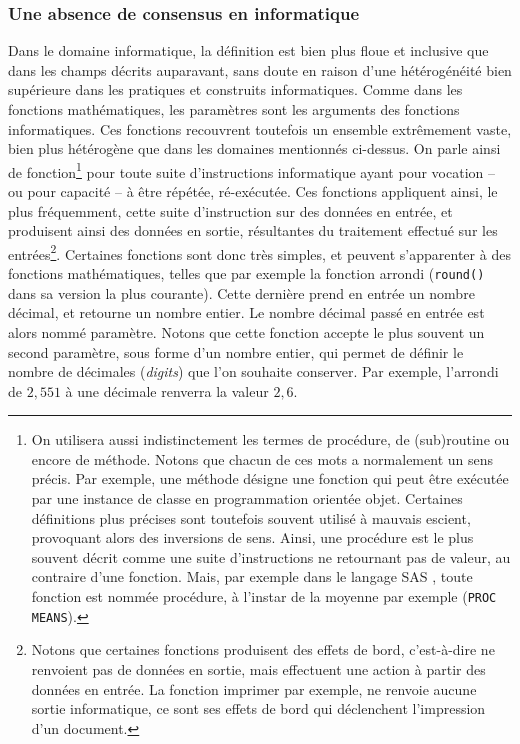 \documentclass[12pt, a4paper, oneside]{book}
\begin{document}
	\subsubsection{Une absence de consensus en informatique}
	Dans le domaine informatique, la définition est bien plus floue et inclusive que dans les champs décrits auparavant, sans doute en raison d'une hétérogénéité bien supérieure dans les pratiques et construits informatiques. Comme dans les fonctions mathématiques, les paramètres sont les arguments des fonctions informatiques. Ces fonctions recouvrent toutefois un ensemble extrêmement vaste, bien plus hétérogène que dans les domaines mentionnés ci-dessus.
	On parle ainsi de fonction\footnote{On utilisera aussi indistinctement les termes de procédure, de (sub)routine ou encore de méthode. Notons que chacun de ces mots a normalement un sens précis. Par exemple, une méthode désigne une fonction qui peut être exécutée par une instance de classe en programmation orientée objet. Certaines définitions plus précises sont toutefois souvent utilisé à mauvais escient, provoquant alors des inversions de sens. Ainsi, une procédure est le plus souvent décrit comme une suite d'instructions ne retournant pas de valeur, au contraire d'une fonction. Mais, par exemple dans le langage SAS \autocite{sas1990sas}, toute fonction est nommée procédure, à l'instar de la moyenne par exemple (\texttt{PROC MEANS}).} pour toute suite d'instructions informatique ayant pour vocation -- ou pour capacité -- à être répétée, ré-exécutée.
	Ces fonctions appliquent ainsi, le plus fréquemment, cette suite d'instruction sur des données en entrée, et produisent ainsi des données en sortie, résultantes du traitement effectué sur les entrées\footnote{
		Notons que certaines fonctions produisent des \og effets de bord\fg{}, c'est-à-dire ne renvoient pas de données en sortie, mais effectuent une action à partir des données en entrée. La fonction imprimer par exemple, ne renvoie aucune sortie informatique, ce sont ses effets de bord qui déclenchent l'impression d'un document.
	}.
	Certaines fonctions sont donc très simples, et peuvent s'apparenter à des fonctions mathématiques, telles que par exemple la fonction arrondi (\texttt{round()} dans sa version la plus courante). Cette dernière prend en entrée un nombre décimal, et retourne un nombre entier. Le nombre décimal passé en entrée est alors nommé paramètre. Notons que cette fonction accepte le plus souvent un second paramètre, sous forme d'un nombre entier, qui permet de définir le nombre de décimales (\textit{digits}) que l'on souhaite conserver. Par exemple, l'arrondi de $2,551$ à une décimale renverra la valeur $2,6$.
\end{document}
